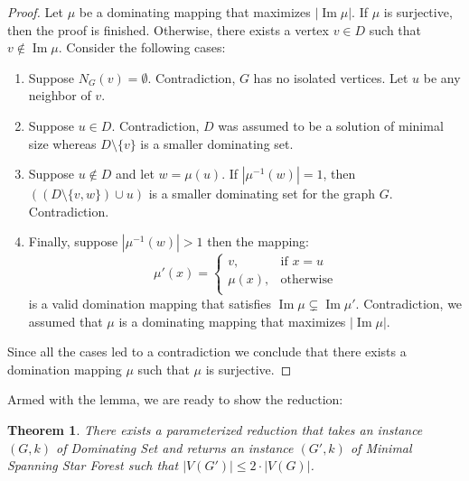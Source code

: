 \documentclass[en]{pracamgr}
\newtheorem{theorem}{Theorem}
\newcommand{\mssfp}{{\sc Minimal Spanning Star Forest}}
\newcommand{\domsetp}{{\sc Dominating Set}}
\DeclareMathOperator{\Ima}{Im}
\begin{document}
\begin{proof}
	Let $\mu$ be a dominating mapping that maximizes $|\Ima \mu|$. If $\mu$ is surjective, then the proof is finished. Otherwise, there exists a vertex $v \in D$ such that $v \notin \Ima \mu$. Consider the following cases:
	\begin{enumerate}
		\item Suppose $N_G(v) = \emptyset$. Contradiction, $G$ has no isolated vertices. Let $u$ be any neighbor of $v$.
		\item Suppose $u \in D$. Contradiction, $D$ was assumed to be a solution of minimal size whereas $D \setminus \{v\}$ is a smaller dominating set.
		\item Suppose $u \notin D$ and let $w = \mu(u)$. If $|\mu^{-1}(w)|=1$, then $((D \setminus \{v,w\}) \cup u)$ is a smaller dominating set for the graph $G$. Contradiction.
		\item Finally, suppose $|\mu^{-1}(w)| > 1$ then the mapping:
		\begin{equation*}
			\mu'(x) = \begin{cases}
			v, & \text{if }x = u \\
			\mu(x), &\text{otherwise} \\
			\end{cases}
		\end{equation*}
		is a valid domination mapping that satisfies $\Ima \mu \subsetneq \Ima \mu'$. Contradiction, we assumed that $\mu$ is a dominating mapping that maximizes $|\Ima \mu|$.
	\end{enumerate}
	
	Since all the cases led to a contradiction we conclude that there exists a domination mapping $\mu$ such that $\mu$ is surjective.  
\end{proof}

Armed with the lemma, we are ready to show the reduction:

\begin{theorem}\label{dom-ssf reduction}
	There exists a parameterized reduction that takes an instance $(G,k)$ of \domsetp{} and returns an instance $(G',k)$ of \mssfp{} such that $|V(G')| \leq 2 \cdot |V(G)|$. 
\end{theorem}
\end{document}
